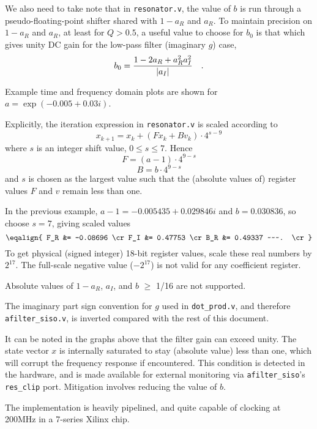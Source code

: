 We also need to take note that in {\tt resonator.v},
the value of $b$ is run
through a pseudo-floating-point shifter shared with $1-a_R$ and $a_R$.
To maintain precision on $1-a_R$ and $a_R$, at least for $Q > 0.5$,
a useful value to choose for $b_0$ is that which gives unity DC gain for the
low-pass filter (imaginary $g$) case,
$$ b_0 = {1 - 2a_R + a_R^2 a_I^2 \over | a_I | } ~~~. $$

Example time and frequency domain plots are shown for $a=\exp(-0.005 + 0.03i)$.
\vfill\eject



\vfill\eject


Explicitly, the iteration expression in {\tt resonator.v} is scaled according
to
$$ x_{k+1} = x_k + (F x_k + B v_k) \cdot 4^{s-9} $$
where $s$ is an integer shift value, $0 \le s \le 7$.
Hence
$$ F = (a-1)\cdot 4^{9-s} $$
$$ B = b\cdot 4^{9-s} $$
and $s$ is chosen as the largest value such that the (absolute values of)
register values $F$ and $v$ remain less than one.

In the previous example, $a-1 = -0.005435 + 0.029846i$ and $b = 0.030836$,
so choose $s=7$, giving scaled values
$$\eqalign{
  F_R &= -0.08696 \cr
  F_I &=  0.47753 \cr
  B_R &=  0.49337 ~~~. \cr}$$
To get physical (signed integer) 18-bit register values, scale these real
numbers by $2^{17}$.  The full-scale negative value ($-2^{17}$) is
not valid for any coefficient register.

Absolute values of $1-a_R$, $a_I$, and $b$ $\ge$ 1/16 are not supported.

The imaginary part sign convention for $g$ used in {\tt dot\_prod.v}, and
therefore {\tt afilter\_siso.v}, is inverted compared with the rest of this document.

It can be noted in the graphs above that the filter gain can exceed
unity.  The state vector $x$ is internally saturated to stay (absolute value)
less than one, which will corrupt the frequency response if encountered.
This condition is detected in the hardware, and is made available for
external monitoring via {\tt afilter\_siso}'s {\tt res\_clip} port.
Mitigation involves reducing the value of $b$.

The implementation is heavily pipelined, and quite capable of clocking
at 200\thinspace MHz in a 7-series Xilinx chip.
\bye
